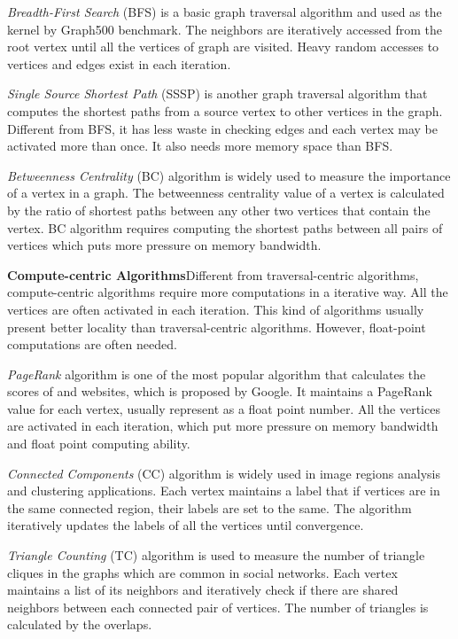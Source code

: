 \documentclass[twoside]{article}
\begin{document}
\begin{multicols}{2}
{\em Breadth-First Search} (BFS) is a basic graph traversal algorithm and used as the kernel by Graph500 benchmark. The neighbors are iteratively accessed from the root vertex until all the vertices of graph are visited. Heavy random accesses to vertices and edges exist in each iteration.

{\em Single Source Shortest Path} (SSSP) is another graph traversal algorithm that computes the shortest paths from a source vertex to other vertices in the graph. Different from BFS, it has less waste in checking edges and each vertex may be activated more than once. It also needs more memory space than BFS.

{\em Betweenness Centrality} (BC) algorithm is widely used to measure the importance of a vertex in a graph. The betweenness centrality value of a vertex is calculated by the ratio of shortest paths between any other two vertices that contain the vertex. BC algorithm requires computing the shortest paths between all pairs of vertices which puts more pressure on memory bandwidth.

{\bf Compute-centric Algorithms}\quad Different from traversal-centric algorithms, compute-centric algorithms require more computations in a iterative way. All the vertices are often activated in each iteration. This kind of algorithms usually present better locality than traversal-centric algorithms. However, float-point computations are often needed.

{\em PageRank} algorithm is one of the most popular algorithm that calculates the scores of and websites, which is proposed by Google. It maintains a PageRank value for each vertex, usually represent as a float point number. All the vertices are activated in each iteration, which put more pressure on memory bandwidth and float point computing ability.

{\em Connected Components} (CC) algorithm is widely used in image regions analysis and clustering applications. Each vertex maintains a label that if vertices are in the same connected region, their labels are set to the same. The algorithm iteratively updates the labels of all the vertices until convergence.

{\em Triangle Counting} (TC) algorithm is used to measure the number of triangle cliques in the graphs which are common in social networks. Each vertex maintains a list of its neighbors and iteratively check if there are shared neighbors between each connected pair of vertices. The number of triangles is calculated by the overlaps.


\end{multicols}
\end{document}
